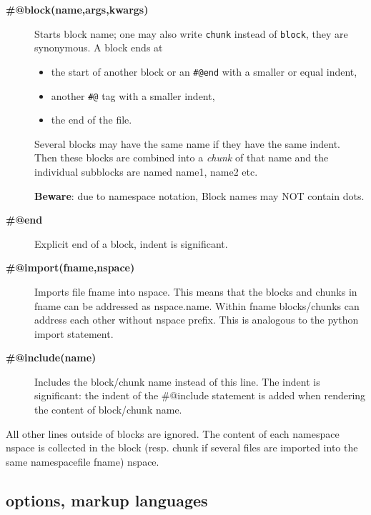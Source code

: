 \documentclass[neutral,proc,reqno]{ml-gen}
\begin{document}
\begin{description}
\item[\textbf{\#@block(name,args,kwargs)}]
Starts block name; one may also write \lstinline!chunk! instead of
\lstinline!block!, they are synonymous. A block ends at

\begin{itemize}
\item
  the start of another block or an \lstinline!#@end! with a smaller or
  equal indent,
\item
  another \lstinline!#@! tag with a smaller indent,
\item
  the end of the file.
\end{itemize}
Several blocks may have the same name if they have the same indent. Then
these blocks are combined into a \emph{chunk} of that name and the
individual subblocks are named name1, name2 etc.

\textbf{Beware}: due to namespace notation, Block names may NOT contain
dots.

\item[\textbf{\#@end}]
Explicit end of a block, indent is significant.

\item[\textbf{\#@import(fname,nspace)}]
Imports file fname into nspace. This means that the blocks and chunks in
fname can be addressed as nspace.name. Within fname blocks/chunks can
address each other without nspace prefix. This is analogous to the
python import statement.

\item[\textbf{\#@include(name)}]
Includes the block/chunk name instead of this line. The indent is
significant: the indent of the \textbar{}\#@include\textbar{} statement
is added when rendering the content of block/chunk name.

\end{description}
All other lines outside of blocks are ignored. The content of each
namespace nspace is collected in the block (resp. chunk if several files
are imported into the same namespacefile fname) nspace.


\subsection{options, markup languages}
\end{document}
